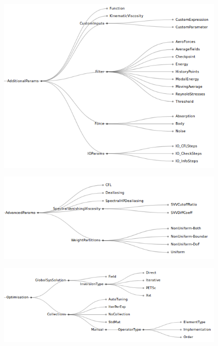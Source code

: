 \documentclass[11pt, a4paper]{report}
\begin{document}
\begin{figure}[tb!]
 \centering
 \includegraphics[width=1\linewidth,  clip=true, trim = 0cm 0cm 0cm 0cm]{AdditionalParameters}
 \label{fig:problemSpecification}
\end{figure}

\begin{figure}[tb!]
 \centering
 \includegraphics[width=1\linewidth,  clip=true, trim = 0cm 0cm 0cm 0cm]{AdvancedParameters}
 \label{fig:problemSpecification}
\end{figure}

\begin{figure}[tb!]
 \centering
 \includegraphics[width=1\linewidth,  clip=true, trim = 0cm 0cm 0cm 0cm]{optimisationb}
 \label{fig:problemSpecification}
\end{figure}
\end{document}
